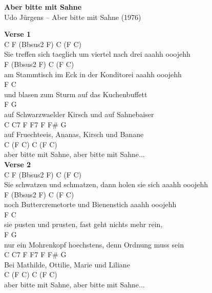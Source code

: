 \documentclass[a4paper]{article}
\begin{document}
    \begin{center}
        \textbf{Aber bitte mit Sahne}
        ~\\
        Udo Jürgens -- Aber bitte mit Sahne (1976)
    \end{center}
    {
        \scriptsize
        \textbf{Verse 1}
        ~\\
        {
            \cutive
            \obeyspaces
C                                                 F (Bbsus2 F)      C (F C)
\\
Sie treffen sich taeglich um viertel nach drei  aaahh          ooojehh
\\
                                           F (Bbsus2 F)      C (F C)
\\
am Stammtisch im Eck in der Konditorei  aaahh          ooojehh
\\
    F                        C
\\
und blasen zum Sturm auf das Kuchenbuffett
\\
    F                            G
\\
auf Schwarzwaelder Kirsch und auf Sahnebaiser
\\
    C           C7      F          F7    F F\# G
\\
auf Fruechteeis, Ananas, Kirsch und Banane
\\
               C (F C)                C (F C)
\\
aber bitte mit Sahne, aber bitte mit Sahne...
\\

        }
        \textbf{Verse 2}
        ~\\
        {
            \cutive
            \obeyspaces
C                                                   F (Bbsus2 F)      C (F C)
\\
Sie schwatzen und schmatzen, dann holen sie sich aaahh          ooojehh
\\
                                         F (Bbsus2 F)      C (F C)
\\
noch Buttercremetorte und Bienenstich aaahh          ooojehh
\\
    F                        C
\\
sie pusten und prusten, fast geht nichts mehr rein,
\\
        F                          G
\\
nur ein Mohrenkopf hoechstens, denn Ordnung muss sein
\\
    C         C7       F         F7      F F\# G
\\
Bei Mathilde, Ottilie, Marie und Liliane
\\
               C (F C)                C (F C)
\\
aber bitte mit Sahne, aber bitte mit Sahne...
\\

}}
\end{document}
